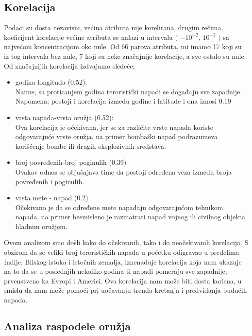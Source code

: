 \documentclass[a4paper]{article}
\begin{document}
\subsection{Korelacija}
  
Podaci su dosta nezavisni, većina atributa nije korelirana, drugim rečima, koeficijent korelacije većine atributa se nalazi u intervalu $($ $-10^{-2}$, $10^{-2}$ $)$ sa najvećom koncentracijom oko nule. Od 66 parova atributa, mi imamo 17 koji su iz tog intervala bez nule, 7 koji su neke značajnije korelacije, a sve ostalo su nule. Od značajnijih korelacija izdvajamo sledeće: 
\begin{itemize} 
	\item godina-longituda (0.52): \\ Naime, sa proticanjem godina teroristički napadi se događaju sve zapadnije.\\ Napomena: postoji i korelacija između godine i latitude i ona iznosi 0.19 
	\item vrsta napada-vrsta oružja (0.52): \\ Ova korelacija je očekivana, jer se za različite vrste napada koriste odgovarajuće vrste oružja, na primer bombaški napad podrazumeva korišćenje bombe ili drugih eksplozivnih sredstava. 
	\item broj povređenih-broj poginulih (0.39) \\ Ovakav odnos se objašnjava time da postoji određena veza između broja povređenih i poginulih. 
	\item vrsta mete - napad (0.2) \\ Očekivano je da se određene mete napadaju odgovarajućom tehnikom napada, na primer besmisleno je razmatrati napad vojnog ili civilnog objekta hladnim oružjem.\\ 
\end{itemize}

Ovom analizom smo došli kako do očekivanih, tako i do neočekivanih korelacija. S obzirom da se veliki broj terorističkih napada u početku odigravao u predelima Indije, Bliskog istoka i istočnih zemalja, iznenađuje korelacija koja nam ukazuje na to da se u poslednjih nekoliko godina ti napadi pomeraju sve zapadnije, prvenstveno ka Evropi i Americi. Ova korelacija nam može biti dosta korisna, u smislu da nam može pomoći pri uočavanju trenda kretanja i predviđanja budućih napada.

\subsection{Analiza raspodele oružja}
\end{document}
